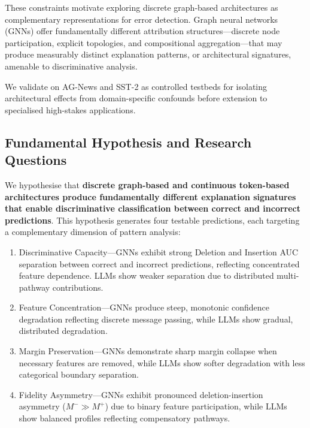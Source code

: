 \documentclass[preprint, times, review, 10pt]{elsarticle}
\begin{document}
These constraints motivate exploring discrete graph-based architectures as complementary representations for error detection. Graph neural networks (GNNs) offer fundamentally different attribution structures—discrete node participation, explicit topologies, and compositional aggregation—that may produce measurably distinct explanation patterns, or architectural signatures, amenable to discriminative analysis.

We validate on AG-News and SST-2 as controlled testbeds for isolating architectural effects from domain-specific confounds before extension to specialised high-stakes applications.


\subsection{Fundamental Hypothesis and Research Questions}\label{subsec:hypothesis}

We hypothesise that \textbf{discrete graph-based and continuous token-based architectures produce fundamentally different explanation signatures that enable discriminative classification between correct and incorrect predictions}. This hypothesis generates four testable predictions, each targeting a complementary dimension of pattern analysis:

\begin{enumerate}

    \item Discriminative Capacity—GNNs exhibit strong Deletion and Insertion AUC separation between correct and incorrect predictions, reflecting concentrated feature dependence. LLMs show weaker separation due to distributed multi-pathway contributions.

    \item Feature Concentration—GNNs produce steep, monotonic confidence degradation reflecting discrete message passing, while LLMs show gradual, distributed degradation.

    \item Margin Preservation—GNNs demonstrate sharp margin collapse when necessary features are removed, while LLMs show softer degradation with less categorical boundary separation.

    \item Fidelity Asymmetry—GNNs exhibit pronounced deletion-insertion asymmetry (\(M^- \gg M^+\)) due to binary feature participation, while LLMs show balanced profiles reflecting compensatory pathways.
    
\end{enumerate}
\end{document}

